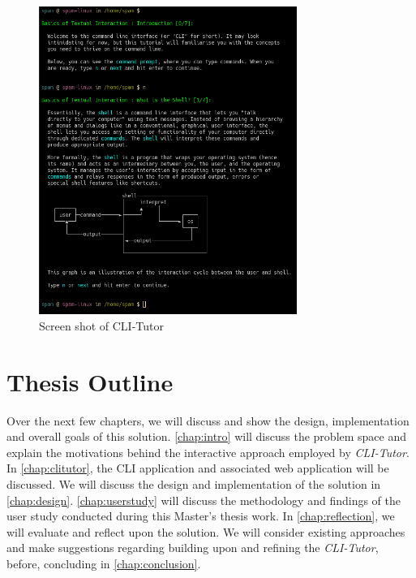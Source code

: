 \begin{figure}[H]
	\centering
	\includegraphics[width=0.75\textwidth]{img/clitutor}
	\caption{Screen shot of CLI-Tutor}
	\label{fig:clitutor}
\end{figure}

\section{Thesis Outline}

Over the next few chapters, we will discuss and show the design, implementation
and overall goals of this solution. \autoref{chap:intro} will discuss the
problem space and explain the motivations behind the interactive approach
employed by \textit{CLI-Tutor}. In \autoref{chap:clitutor}, the CLI application
and associated web application will be discussed. We will discuss the design
and implementation of the solution in \autoref{chap:design}.
\autoref{chap:userstudy} will discuss the methodology and findings of the user
study conducted during this Master's thesis work. In \autoref{chap:reflection},
we will evaluate and reflect upon the solution. We will consider existing
approaches and make suggestions regarding building upon and refining the
\textit{CLI-Tutor}, before, concluding in \autoref{chap:conclusion}.



